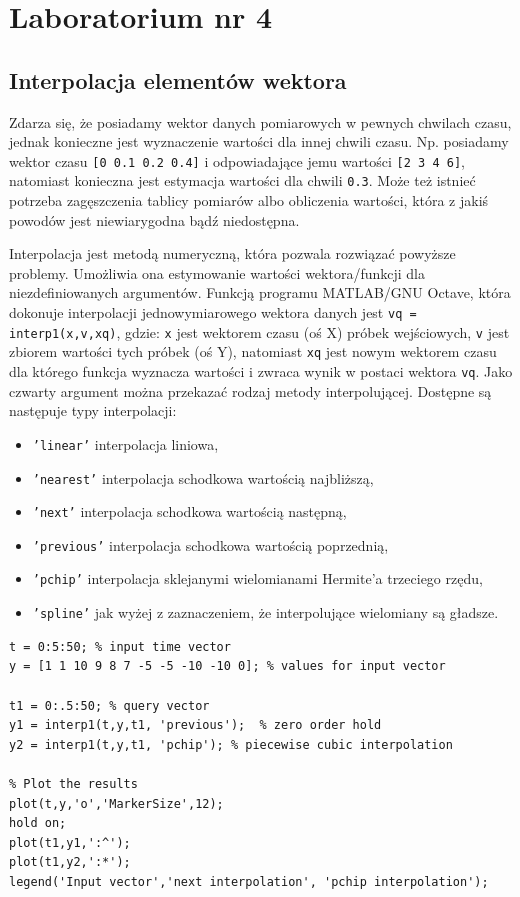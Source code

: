 \section{Laboratorium nr 4}

\subsection{Interpolacja elementów wektora}\label{lab4/sec/interpolation}
Zdarza się, że posiadamy wektor danych pomiarowych w pewnych chwilach czasu, jednak konieczne jest wyznaczenie wartości dla innej chwili czasu. Np. posiadamy wektor czasu \texttt{[0 0.1 0.2 0.4]} i odpowiadające jemu wartości  \texttt{[2 3 4 6]}, natomiast konieczna jest estymacja wartości dla chwili \texttt{0.3}. Może też istnieć potrzeba zagęszczenia tablicy pomiarów albo obliczenia wartości, która z jakiś powodów jest niewiarygodna bądź niedostępna. 
	
Interpolacja jest metodą numeryczną, która pozwala rozwiązać powyższe problemy. Umożliwia ona estymowanie wartości wektora/funkcji dla niezdefiniowanych argumentów. Funkcją programu MATLAB/GNU Octave, która dokonuje interpolacji jednowymiarowego wektora danych jest \texttt{vq = interp1(x,v,xq)}, gdzie: \texttt{x} jest wektorem czasu (oś X) próbek wejściowych, \texttt{v} jest zbiorem wartości tych próbek (oś Y), natomiast \texttt{xq} jest nowym wektorem czasu dla którego funkcja wyznacza wartości i zwraca wynik w postaci wektora \texttt{vq}. Jako czwarty argument można przekazać rodzaj metody interpolującej. Dostępne są następuje typy interpolacji:
\begin{itemize}
	\item \texttt{'linear'} interpolacja liniowa,
	\item \texttt{'nearest'} interpolacja schodkowa wartością najbliższą,
	\item \texttt{'next'} interpolacja schodkowa wartością następną,
	\item \texttt{'previous'} interpolacja schodkowa wartością poprzednią,
	\item \texttt{'pchip'} interpolacja sklejanymi wielomianami Hermite'a trzeciego rzędu,
	\item \texttt{'spline'} jak wyżej z zaznaczeniem, że interpolujące wielomiany są gładsze.
\end{itemize}


\begin{lstlisting}[caption=Interpolacja danych pomiarowych, label=lab4/lst/interpolationExample]
t = 0:5:50; % input time vector
y = [1 1 10 9 8 7 -5 -5 -10 -10 0]; % values for input vector

t1 = 0:.5:50; % query vector
y1 = interp1(t,y,t1, 'previous');  % zero order hold
y2 = interp1(t,y,t1, 'pchip'); % piecewise cubic interpolation 

% Plot the results
plot(t,y,'o','MarkerSize',12);
hold on;
plot(t1,y1,':^');
plot(t1,y2,':*');
legend('Input vector','next interpolation', 'pchip interpolation');
\end{lstlisting}

